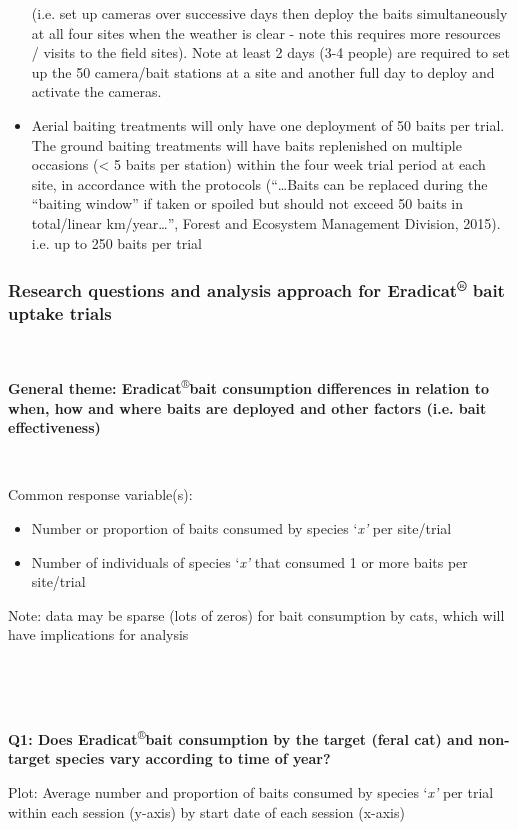 \documentclass[version=last,
    paper=a4,                               %
    10pt,                                   %
    dvipsnames,
    oneside,                              %
    headings=openany,                       %
    open=any,
    BCOR=7mm,                               %
    DIV=15,     %
]{scrbook}
\begin{document}
\begin{itemize}
  (i.e. set up cameras over successive days then deploy the baits
  simultaneously at all four sites when the weather is clear - note this
  requires more resources / visits to the field sites). Note at least 2
  days (3-4 people) are required to set up the 50 camera/bait stations
  at a site and another full day to deploy and activate the cameras.
\item
  Aerial baiting treatments will only have one deployment of 50 baits
  per trial. The ground baiting treatments will have baits replenished
  on multiple occasions (\textless{} 5 baits per station) within the
  four week trial period at each site, in accordance with the protocols
  (``\ldots{}Baits can be replaced during the ``baiting window'' if
  taken or spoiled but should not exceed 50 baits in total/linear
  km/year\ldots{}'', Forest and Ecosystem Management Division, 2015).
  i.e. up to 250 baits per trial
\end{itemize}

\subsubsection{Research questions and analysis approach for
Eradicat\textsuperscript{®} bait uptake trials}

~

\textbf{General theme: Eradicat}\textsuperscript{®}\textbf{bait
consumption differences in relation to when, how and where baits are
deployed and other factors (i.e. bait effectiveness)}

~

Common response variable(s):

\begin{itemize}
\itemsep1pt\parskip0pt
\item
  Number or proportion of baits consumed by species `\emph{x'} per
  site/trial
\item
  Number of individuals of species `\emph{x'} that consumed 1 or more
  baits per site/trial
\end{itemize}

Note: data may be sparse (lots of zeros) for bait consumption by cats,
which will have implications for analysis

~

~

\textbf{Q1: Does Eradicat}\textsuperscript{®}\textbf{bait consumption by
the target (feral cat) and non-target species vary according to time of
year?}

Plot: Average number and proportion of baits consumed by species
`\emph{x'} per trial within each session (y-axis) by start date of each
session (x-axis)
\end{document}
